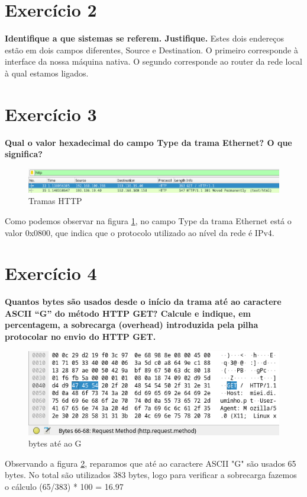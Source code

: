 \documentclass[a4paper]{report}
\begin{document}
\section{Exercício 2}
\textbf{Identifique a que sistemas se referem. Justifique.}
Estes dois endereços estão em dois campos diferentes, Source e Destination.
O primeiro corresponde à interface da nossa máquina nativa. O segundo
corresponde ao router da rede local à qual estamos ligados.

\section{Exercício 3}
\textbf{Qual o valor hexadecimal do campo Type da trama Ethernet? O que
significa?}

\begin{figure}[H]
    \centering 
    \includegraphics[width=\textwidth]{images/tramasHttp.png}  
    \caption{Tramas HTTP}
    \label{fig:tramasHttp}
\end{figure}
Como podemos observar na figura \ref{fig:tramasHttp}, no campo Type da trama
Ethernet está o valor 0x0800, que indica que o protocolo utilizado ao nível da
rede é IPv4.

\section{Exercício 4}
\textbf{Quantos bytes são usados desde o início da trama até ao caractere ASCII
“G” do método HTTP GET? Calcule e indique, em percentagem, a sobrecarga
(overhead) introduzida pela pilha protocolar no envio do HTTP GET.}

\begin{figure}[H]
    \centering 
    \includegraphics[width=\textwidth]{images/bytes2G.png}
    \caption{bytes até ao G}
    \label{fig:bytes2G}
\end{figure}
Observando a figura \ref{fig:bytes2G}, reparamos que até ao caractere ASCII "G"
são usados 65 bytes.
No total são utilizados 383 bytes, logo para verificar a sobrecarga fazemos o
cálculo (65/383) * 100 = 16.97%
\end{document}
